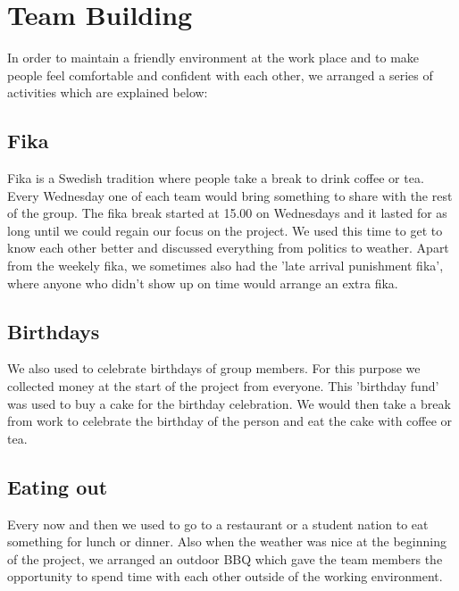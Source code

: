 \section{Team Building}

In order to maintain a friendly environment at the work place and to make people
feel comfortable and confident with each other, we arranged a series of activities
which are explained below:

\subsection{Fika}
Fika is a Swedish tradition where people take a break to drink coffee or tea. Every Wednesday one
of each team would bring something to share with the rest of the group. The fika break started at 15.00 
on Wednesdays and it lasted for as long until we could regain our focus on the project. We used this time to get to know each other better and discussed 
everything from politics to weather. Apart from the weekely fika, we sometimes also had the 'late arrival punishment fika',
where anyone who didn't show up on time would arrange an extra fika.

\subsection{Birthdays}
We also used to celebrate birthdays of group members. For this purpose we collected 
money at the start of the project from everyone. This 'birthday fund' was used to buy a cake for the birthday celebration. 
We would then take a break from work to celebrate the birthday of the person and eat the cake with coffee or tea. 

\subsection{Eating out}
Every now and then we used to go to a restaurant or a student nation to eat something for lunch or dinner. Also when the weather 
was nice at the beginning of the project, we arranged an outdoor BBQ which gave the team members the opportunity to spend time with each
other outside of the working environment.